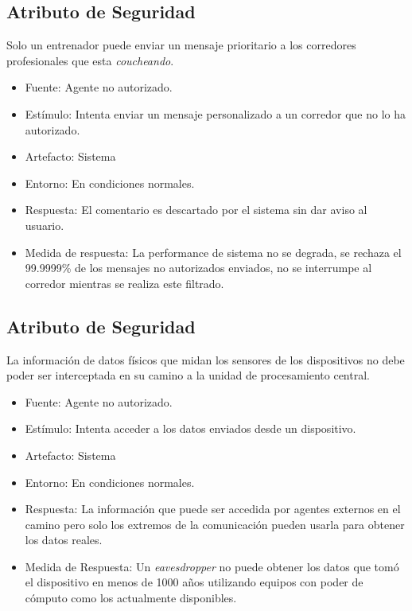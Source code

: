 \subsection{Atributo de Seguridad}

Solo un entrenador puede enviar un mensaje prioritario a los corredores
profesionales que esta \emph{coucheando}.

\begin{itemize}
\itemsep1pt\parskip0pt
\item
  Fuente: Agente no autorizado.
\item
  Estímulo: Intenta enviar un mensaje personalizado a un corredor que no
  lo ha autorizado.
\item
  Artefacto: Sistema
\item
  Entorno: En condiciones normales.
\item
  Respuesta: El comentario es descartado por el sistema sin dar aviso al
  usuario.
\item
  Medida de respuesta: La performance de sistema no se degrada, se
  rechaza el 99.9999\% de los mensajes no autorizados enviados, no se
  interrumpe al corredor mientras se realiza este filtrado.
\end{itemize}

\subsection{Atributo de Seguridad}

La información de datos físicos que midan los sensores de los
dispositivos no debe poder ser interceptada en su camino a la unidad de
procesamiento central.

\begin{itemize}
\itemsep1pt\parskip0pt
\item
  Fuente: Agente no autorizado.
\item
  Estímulo: Intenta acceder a los datos enviados desde un dispositivo.
\item
  Artefacto: Sistema
\item
  Entorno: En condiciones normales.
\item
  Respuesta: La información que puede ser accedida por agentes externos
  en el camino pero solo los extremos de la comunicación pueden usarla
  para obtener los datos reales.
\item
  Medida de Respuesta: Un \emph{eavesdropper} no puede obtener los datos
  que tomó el dispositivo en menos de 1000 años utilizando equipos con
  poder de cómputo como los actualmente disponibles.
\end{itemize}

